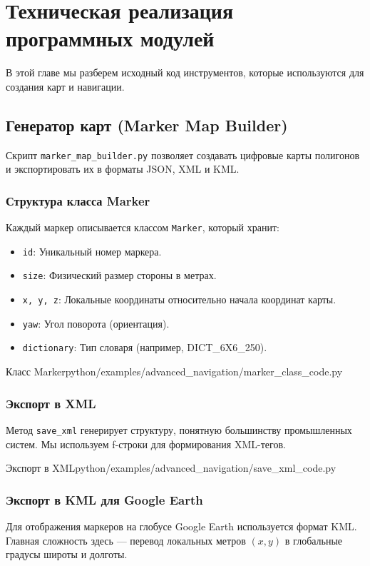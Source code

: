 \section{Техническая реализация программных модулей}

В этой главе мы разберем исходный код инструментов, которые используются для создания карт и навигации.

\subsection{Генератор карт (Marker Map Builder)}
Скрипт \texttt{marker\_map\_builder.py} позволяет создавать цифровые карты полигонов и экспортировать их в форматы JSON, XML и KML.

\subsubsection{Структура класса Marker}
Каждый маркер описывается классом \texttt{Marker}, который хранит:
\begin{itemize}
    \item \texttt{id}: Уникальный номер маркера.
    \item \texttt{size}: Физический размер стороны в метрах.
    \item \texttt{x, y, z}: Локальные координаты относительно начала координат карты.
    \item \texttt{yaw}: Угол поворота (ориентация).
    \item \texttt{dictionary}: Тип словаря (например, DICT\_6X6\_250).
\end{itemize}

\begin{codefiletitle}[python]{Класс Marker}{python/examples/advanced_navigation/marker_class_code.py}
\end{codefiletitle}

\subsubsection{Экспорт в XML}
Метод \texttt{save\_xml} генерирует структуру, понятную большинству промышленных систем. Мы используем f-строки для формирования XML-тегов.

\begin{codefiletitle}[python]{Экспорт в XML}{python/examples/advanced_navigation/save_xml_code.py}
\end{codefiletitle}

\subsubsection{Экспорт в KML для Google Earth}
Для отображения маркеров на глобусе Google Earth используется формат KML. Главная сложность здесь — перевод локальных метров $(x, y)$ в глобальные градусы широты и долготы.

